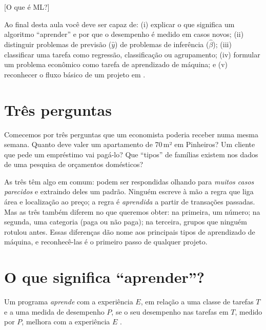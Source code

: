 [O que é ML?]

\begin{intuicao}[title={Objetivos da aula}]
Ao final desta aula você deve ser capaz de: (i) explicar o que significa um
algoritmo ``aprender'' e por que o desempenho é medido em casos novos;
(ii) distinguir problemas de previsão ($\hat y$) de problemas de inferência
($\hat\beta$); (iii) classificar uma tarefa como regressão, classificação ou
agrupamento; (iv) formular um problema econômico como tarefa de aprendizado de
máquina; e (v) reconhecer o fluxo básico de um projeto em .
\end{intuicao}

\section{Três perguntas}

Comecemos por três perguntas que um economista poderia receber numa mesma
semana. Quanto deve valer um apartamento de 70\,m² em Pinheiros? Um cliente que
pede um empréstimo vai pagá-lo? Que ``tipos'' de famílias existem nos dados de
uma pesquisa de orçamentos domésticos?

As três têm algo em comum: podem ser respondidas olhando para \emph{muitos casos
parecidos} e extraindo deles um padrão. Ninguém escreve à mão a regra que liga
área e localização ao preço; a regra é \emph{aprendida} a partir de transações
passadas. Mas as três também diferem no que queremos obter: na primeira, um
número; na segunda, uma categoria (paga ou não paga); na terceira, grupos que
ninguém rotulou antes. Essas diferenças dão nome aos principais tipos de
aprendizado de máquina, e reconhecê-las é o primeiro passo de qualquer projeto.

\section{O que significa ``aprender''?}

\begin{definicao}
Um programa \emph{aprende} com a experiência $E$, em relação a uma classe de
tarefas $T$ e a uma medida de desempenho $P$, se o seu desempenho nas tarefas
em $T$, medido por $P$, melhora com a experiência $E$ \parencite{mitchell1997}.
\end{definicao}

